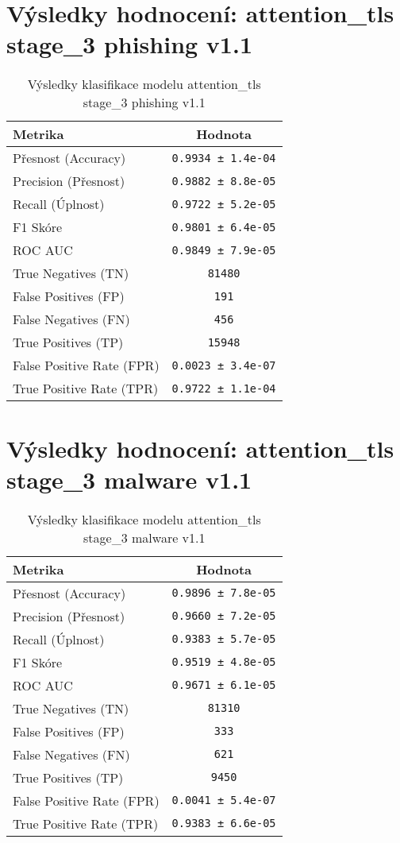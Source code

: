 \section*{Výsledky hodnocení: attention_tls stage_3 phishing v1.1}
\begin{table}[h!]
\centering
\begin{tabular}{|l|c|}
\hline
\textbf{Metrika} & \textbf{Hodnota} \\
\hline
Přesnost (Accuracy) & \texttt{0.9934 ± 1.4e-04} \\
Precision (Přesnost) & \texttt{0.9882 ± 8.8e-05} \\
Recall (Úplnost) & \texttt{0.9722 ± 5.2e-05} \\
F1 Skóre & \texttt{0.9801 ± 6.4e-05} \\
ROC AUC & \texttt{0.9849 ± 7.9e-05} \\
True Negatives (TN) & \texttt{81480} \\
False Positives (FP) & \texttt{191} \\
False Negatives (FN) & \texttt{456} \\
True Positives (TP) & \texttt{15948} \\
False Positive Rate (FPR) & \texttt{0.0023 ± 3.4e-07} \\
True Positive Rate (TPR) & \texttt{0.9722 ± 1.1e-04} \\
\hline
\end{tabular}
\caption{Výsledky klasifikace modelu attention_tls stage_3 phishing v1.1}
\label{tab:phishing_attention_tls}
\end{table}

\section*{Výsledky hodnocení: attention_tls stage_3 malware v1.1}
\begin{table}[h!]
\centering
\begin{tabular}{|l|c|}
\hline
\textbf{Metrika} & \textbf{Hodnota} \\
\hline
Přesnost (Accuracy) & \texttt{0.9896 ± 7.8e-05} \\
Precision (Přesnost) & \texttt{0.9660 ± 7.2e-05} \\
Recall (Úplnost) & \texttt{0.9383 ± 5.7e-05} \\
F1 Skóre & \texttt{0.9519 ± 4.8e-05} \\
ROC AUC & \texttt{0.9671 ± 6.1e-05} \\
True Negatives (TN) & \texttt{81310} \\
False Positives (FP) & \texttt{333} \\
False Negatives (FN) & \texttt{621} \\
True Positives (TP) & \texttt{9450} \\
False Positive Rate (FPR) & \texttt{0.0041 ± 5.4e-07} \\
True Positive Rate (TPR) & \texttt{0.9383 ± 6.6e-05} \\
\hline
\end{tabular}
\caption{Výsledky klasifikace modelu attention_tls stage_3 malware v1.1}
\label{tab:malware_attention_tls}
\end{table}

